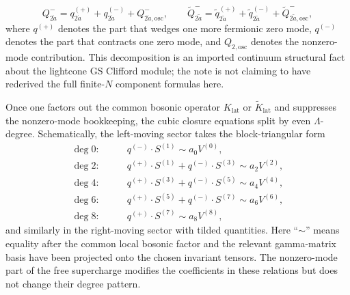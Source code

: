 \documentclass[11pt]{article}
\numberwithin{equation}{section}
\begin{document}
\begin{equation}
\label{eq:s15-017}
Q^-_{2\dot a}
=
q^{(+)}_{2\dot a}+q^{(-)}_{2\dot a}+Q^-_{2\dot a,\mathrm{osc}},
\qquad
\widetilde Q^-_{2\widetilde a}
=
\widetilde q^{(+)}_{2\widetilde a}+\widetilde q^{(-)}_{2\widetilde a}+\widetilde Q^-_{2\widetilde a,\mathrm{osc}},
\end{equation}
where $q^{(+)}$ denotes the part that wedges one more fermionic zero mode, $q^{(-)}$ denotes the part that contracts one zero mode, and $Q_{2,\mathrm{osc}}$ denotes the nonzero-mode contribution. This decomposition is an imported continuum structural fact about the lightcone GS Clifford module; the note is not claiming to have rederived the full finite-$N$ component formulas here.

Once one factors out the common bosonic operator $K_{\mathrm{lat}}$ or $\widetilde K_{\mathrm{lat}}$ and suppresses the nonzero-mode bookkeeping, the cubic closure equations split by even $\Lambda$-degree. Schematically, the left-moving sector takes the block-triangular form
\begin{equation}
\label{eq:s15-018}
\begin{aligned}
\deg 0: &\qquad q^{(-)}\cdot S^{(1)} \sim a_0 V^{(0)},\\
\deg 2: &\qquad q^{(+)}\cdot S^{(1)} + q^{(-)}\cdot S^{(3)} \sim a_2 V^{(2)},\\
\deg 4: &\qquad q^{(+)}\cdot S^{(3)} + q^{(-)}\cdot S^{(5)} \sim a_4 V^{(4)},\\
\deg 6: &\qquad q^{(+)}\cdot S^{(5)} + q^{(-)}\cdot S^{(7)} \sim a_6 V^{(6)},\\
\deg 8: &\qquad q^{(+)}\cdot S^{(7)} \sim a_8 V^{(8)},
\end{aligned}
\end{equation}
and similarly in the right-moving sector with tilded quantities. Here ``$\sim$'' means equality after the common local bosonic factor and the relevant gamma-matrix basis have been projected onto the chosen invariant tensors. The nonzero-mode part of the free supercharge modifies the coefficients in these relations but does not change their degree pattern.
\end{document}
